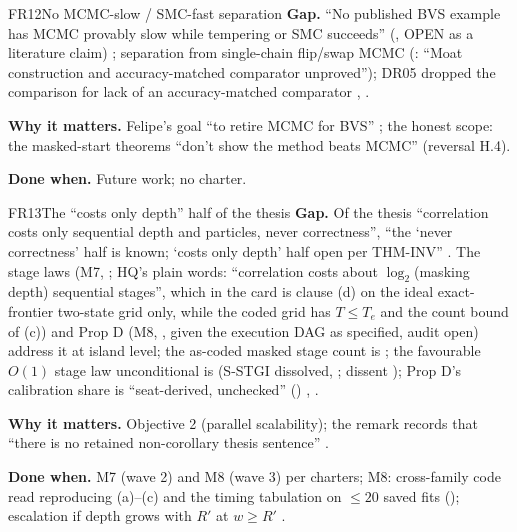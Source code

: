 \begin{card}{FR12}{No MCMC-slow / SMC-fast separation}
\textbf{Gap.} ``No published BVS example has MCMC provably slow while tempering or SMC succeeds'' (, OPEN as a literature claim) ; separation from single-chain flip/swap MCMC (: ``Moat construction and accuracy-matched comparator unproved''); DR05 dropped the comparison for lack of an accuracy-matched comparator , .

\textbf{Why it matters.} Felipe's goal ``to retire MCMC for BVS'' ; the honest scope: the masked-start theorems ``don't show the method beats MCMC'' (reversal H.4).

\textbf{Done when.} Future work; no charter.
\end{card}

\begin{card}{FR13}{The ``costs only depth'' half of the thesis}
\textbf{Gap.} Of the thesis ``correlation costs only sequential depth and particles, never correctness'', ``the `never correctness' half is known; `costs only depth' half open per THM-INV'' . The stage laws (M7, ; HQ's plain words: ``correlation costs about $\log_2$(masking depth) sequential stages'', which in the card is clause (d) on the ideal exact-frontier two-state grid only, while the coded grid has $T\le T_e$ and the count bound of (c)) and Prop D (M8, , given the execution DAG as specified, audit open) address it at island level; the as-coded masked stage count is ; the favourable $O(1)$ stage law unconditional is  (S-STGI dissolved, ; dissent ); Prop D's calibration share is ``seat-derived, unchecked'' () , .

\textbf{Why it matters.} Objective 2 (parallel scalability); the remark  records that ``there is no retained non-corollary thesis sentence'' .

\textbf{Done when.} M7 (wave 2) and M8 (wave 3) per charters; M8: cross-family code read reproducing (a)--(c) and the timing tabulation on $\le20$ saved fits (); escalation if depth grows with $R'$ at $w\ge R'$ .
\end{card}

